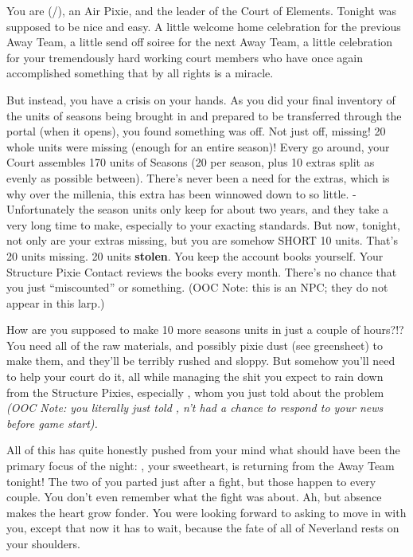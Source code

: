 \documentclass[char]{PP}
\begin{document}
\name{\cEHead{}}

You are \cEHead{} (\cEHead{\They}/\cEHead{\Them}), an Air Pixie, and the leader of the Court of Elements. Tonight was supposed to be nice and easy. A little welcome home celebration for the previous Away Team, a little send off soiree for the next Away Team, a little celebration for your tremendously hard working court members who have once again accomplished something that by all rights is a miracle.

But instead, you have a crisis on your hands. As you did your final inventory of the units of seasons being brought in and prepared to be transferred through the portal (when it opens), you found something was off. Not just off, missing! 20 whole units were missing (enough for an entire season)! Every go around, your Court assembles 170 units of Seasons (20 per season, plus 10 extras split as evenly as possible between). There's never been a need for the extras, which is why over the millenia, this extra has been winnowed down to so little. - Unfortunately the season units only keep for about two years, and they take a very long time to make, especially to your exacting standards. But now, tonight, not only are your extras missing, but you are somehow SHORT 10 units. That's 20 units missing. 20 units \textbf{stolen}. You keep the account books yourself. Your Structure Pixie Contact reviews the books every month. There's no chance that you just “miscounted” or something. (OOC Note: this is an NPC; they do not appear in this larp.)

How are you supposed to make 10 more seasons units in just a couple of hours?!? You need all of the raw materials, and possibly pixie dust (see greensheet) to make them, and they'll be terribly rushed and sloppy. But somehow you'll need to help your court do it, all while managing the shit you expect to rain down from the Structure Pixies, especially \cSHead{}, whom you just told about the problem \textit{(OOC Note: you literally just told \cSHead{\them}, \cSHead{\they} \cSHead{\have}n't had a chance to respond to your news before game start).}

All of this has quite honestly pushed from your mind what should have been the primary focus of the night: \cELove{}, your sweetheart, is returning from the Away Team tonight! The two of you parted just after a fight, but those happen to every couple. You don't even remember what the fight was about. Ah, but absence makes the heart grow fonder. You were looking forward to asking  \cELove{} to move in with you, except that now it has to wait, because the fate of all of Neverland rests on your shoulders.
\end{document}
